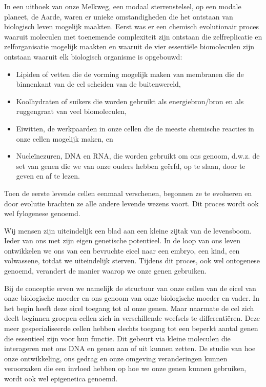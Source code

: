 \documentclass[
  11pt,
]{book}
\providecommand{\tightlist}{%
  \setlength{\itemsep}{0pt}\setlength{\parskip}{0pt}}
\begin{document}
In een uithoek van onze Melkweg, een modaal sterrenstelsel, op een modale planeet, de Aarde, waren er unieke omstandigheden die het ontstaan van biologisch leven mogelijk maakten. Eerst was er een chemisch evolutionair proces waaruit moleculen met toenemende complexiteit zijn ontstaan die zelfreplicatie en zelforganisatie mogelijk maakten en waaruit de vier essentiële biomoleculen zijn ontstaan waaruit elk biologisch organisme is opgebouwd:

\begin{itemize}
\tightlist
\item
  Lipiden of vetten die de vorming mogelijk maken van membranen die de binnenkant van de cel scheiden van de buitenwereld,
\item
  Koolhydraten of suikers die worden gebruikt als energiebron/bron en als ruggengraat van veel biomoleculen,
\item
  Eiwitten, de werkpaarden in onze cellen die de meeste chemische reacties in onze cellen mogelijk maken, en
\item
  Nucleïnezuren, DNA en RNA, die worden gebruikt om ons genoom, d.w.z. de set van genen die we van onze ouders hebben geërfd, op te slaan, door te geven en af te lezen.
\end{itemize}

Toen de eerste levende cellen eenmaal verschenen, begonnen ze te evolueren en door evolutie brachten ze alle andere levende wezens voort. Dit proces wordt ook wel fylogenese genoemd.

Wij mensen zijn uiteindelijk een blad aan een kleine zijtak van de levensboom. Ieder van ons met zijn eigen genetische potentieel. In de loop van ons leven ontwikkelen we ons van een bevruchte eicel naar een embryo, een kind, een volwassene, totdat we uiteindelijk sterven. Tijdens dit proces, ook wel ontogenese genoemd, verandert de manier waarop we onze genen gebruiken.

Bij de conceptie erven we namelijk de structuur van onze cellen van de eicel van onze biologische moeder en ons genoom van onze biologische moeder en vader. In het begin heeft deze eicel toegang tot al onze genen. Maar naarmate de cel zich deelt beginnen groepen cellen zich in verschillende weefsels te differentiëren. Deze meer gespecialiseerde cellen hebben slechts toegang tot een beperkt aantal genen die essentieel zijn voor hun functie. Dit gebeurt via kleine moleculen die interageren met ons DNA en genen aan of uit kunnen zetten. De studie van hoe onze ontwikkeling, ons gedrag en onze omgeving veranderingen kunnen veroorzaken die een invloed hebben op hoe we onze genen kunnen gebruiken, wordt ook wel epigenetica genoemd.
\end{document}
